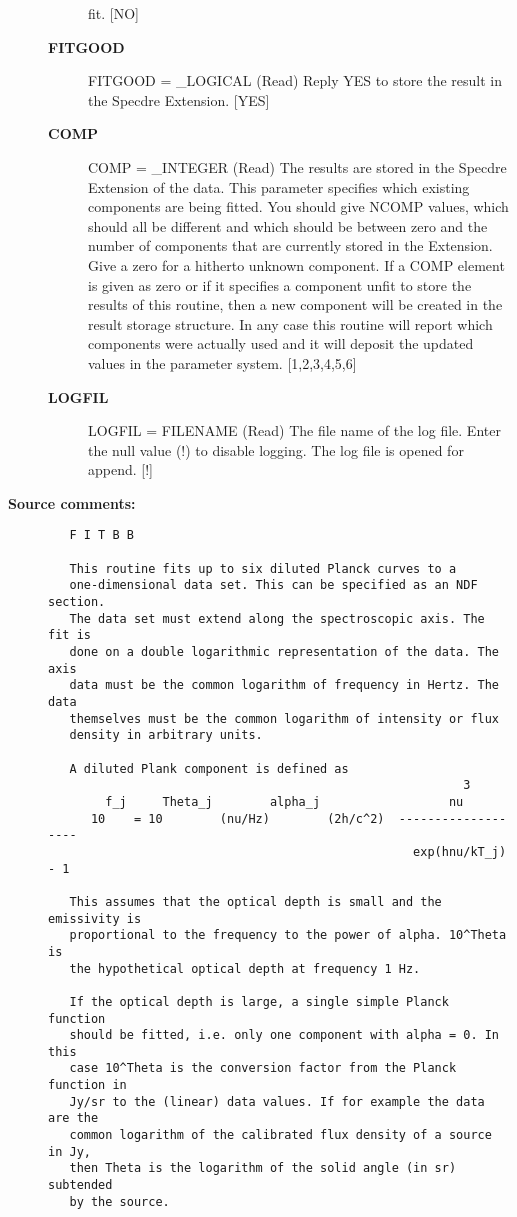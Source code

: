 \begin{description}
\begin{description}
   fit. [NO]
\item [{\bf FITGOOD}]
FITGOOD = _LOGICAL (Read)
   Reply YES to store the result in the Specdre Extension. [YES]
\item [{\bf COMP}]
COMP = _INTEGER (Read)
   The results are stored in the Specdre Extension of the data.
   This parameter specifies which existing components are being
   fitted. You should give NCOMP values, which should all be
   different and which should be between zero and the number of
   components that are currently stored in the Extension. Give a
   zero for a hitherto unknown component. If a COMP element is
   given as zero or if it specifies a component unfit to store the
   results of this routine, then a new component will be created
   in the result storage structure. In any case this routine will
   report which components were actually used and it will deposit
   the updated values in the parameter system. [1,2,3,4,5,6]
\item [{\bf LOGFIL}]
LOGFIL = FILENAME (Read)
   The file name of the log file. Enter the null value (!) to
   disable logging. The log file is opened for append. [!]

\end{description}

\item [{\bf Source comments:}]
\begin{verbatim}
   F I T B B

   This routine fits up to six diluted Planck curves to a
   one-dimensional data set. This can be specified as an NDF section.
   The data set must extend along the spectroscopic axis. The fit is
   done on a double logarithmic representation of the data. The axis
   data must be the common logarithm of frequency in Hertz. The data
   themselves must be the common logarithm of intensity or flux
   density in arbitrary units.

   A diluted Plank component is defined as
                                                          3
        f_j     Theta_j        alpha_j                  nu
      10    = 10        (nu/Hz)        (2h/c^2)  -------------------
                                                   exp(hnu/kT_j) - 1

   This assumes that the optical depth is small and the emissivity is
   proportional to the frequency to the power of alpha. 10^Theta is
   the hypothetical optical depth at frequency 1 Hz.

   If the optical depth is large, a single simple Planck function
   should be fitted, i.e. only one component with alpha = 0. In this
   case 10^Theta is the conversion factor from the Planck function in
   Jy/sr to the (linear) data values. If for example the data are the
   common logarithm of the calibrated flux density of a source in Jy,
   then Theta is the logarithm of the solid angle (in sr) subtended
   by the source.


\end{verbatim}
\end{description}
